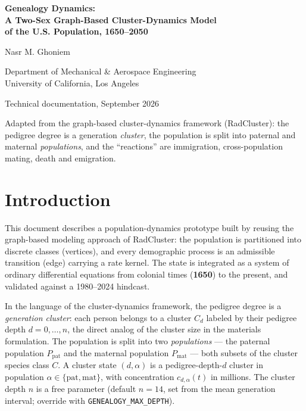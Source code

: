 \documentclass[11pt,a4paper]{article}
\begin{document}
\begin{center}
\vspace*{0.5cm}
{\LARGE\bfseries\color{nmblue} Genealogy Dynamics:\\[0.3em]
A Two-Sex Graph-Based Cluster-Dynamics Model\\[0.3em] of the U.S. Population, 1650--2050}
\vspace{0.4cm}

{\large Nasr M. Ghoniem}

{\normalsize Department of Mechanical \& Aerospace Engineering\\
University of California, Los Angeles}
\vspace{0.3cm}

{\normalsize\textcolor{nmgray}{Technical documentation, September 2026}}
\vspace{0.4cm}

{\small\textcolor{nmgray}{Adapted from the graph-based cluster-dynamics framework
(RadCluster): the pedigree degree is a generation \emph{cluster}, the
population is split into paternal and maternal \emph{populations}, and the
``reactions'' are immigration, cross-population mating, death and
emigration.}}
\end{center}
\vspace{0.6cm}

\section{Introduction}
This document describes a population-dynamics prototype built by reusing the
graph-based modeling approach of RadCluster: the population is partitioned
into discrete classes (vertices), and every demographic process is an
admissible transition (edge) carrying a rate kernel.  The state is integrated
as a system of ordinary differential equations from colonial times
(\textbf{1650}) to the present, and validated against a 1980--2024 hindcast.

In the language of the cluster-dynamics framework, the pedigree degree is a
\emph{generation cluster}: each person belongs to a cluster $C_d$ labeled by
their pedigree depth $d=0,\dots,n$, the direct analog of the cluster size in
the materials formulation.  The population is split into two
\emph{populations} --- the paternal population $P_{\mathrm{pat}}$ and the
maternal population $P_{\mathrm{mat}}$ --- both subsets of the cluster
species class $C$.  A cluster state $(d,\alpha)$ is a pedigree-depth-$d$
cluster in population $\alpha\in\{\mathrm{pat},\mathrm{mat}\}$, with
concentration $c_{d,\alpha}(t)$ in millions.  The cluster depth $n$ is a free
parameter (default $n=14$, set from the mean generation interval; override
with \texttt{GENEALOGY\_MAX\_DEPTH}).
\end{document}
